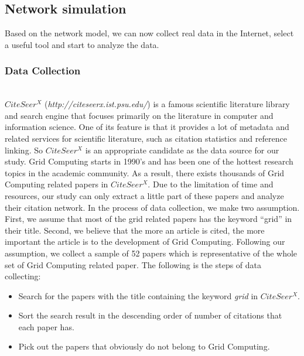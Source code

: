 \subsection{Network simulation}

Based on the network model, we can now collect real data in the Internet, select a useful tool and start to analyze the data. 
\subsubsection{Data Collection}
~\\
$CiteSeer^X$ ({\em http://citeseerx.ist.psu.edu/}) is a famous scientific literature library and search engine that focuses primarily on the literature in computer and information science. One of its feature is that it provides a lot of metadata and related services for scientific literature, such as citation statistics and reference linking. So $CiteSeer^X$ is an appropriate candidate as the data source for our study. Grid Computing starts in 1990's and has been one of the hottest research topics in the academic community.  As a result, there exists thousands of Grid Computing related papers in $CiteSeer^X$. Due to the limitation of time and resources, our study can only extract a little part of these papers and analyze their citation network. In the process of data collection, we make two assumption. First, we assume that most of the grid related papers has the keyword ``grid'' in their title. Second, we believe that the more an article is cited, the more important the article is to the development of Grid Computing. Following our assumption, we collect a sample of 52 papers which is representative of the whole set of Grid Computing related paper.  The following is the steps of data collecting:
\begin{itemize}
\item Search for the papers with the title containing the keyword {\em grid} in $CiteSeer^X$. 
\item Sort the search result in the descending order of number of citations that each paper has. 
\item Pick out the papers that obviously do not belong to Grid Computing. 
\end{itemize}  



